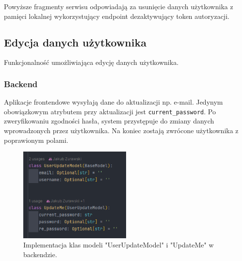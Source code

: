 Powyższe fragmenty serwisu odpowiadają za usunięcie danych użytkownika z pamięci lokalnej wykorzystujący endpoint dezaktywujący token autoryzacji.

\subsection{Edycja danych użytkownika}
Funkcjonalność umożliwiająca edycję danych użytkownika.

\subsubsection{Backend}
Aplikacje frontendowe wysyłają dane do aktualizacji np. e-mail. Jedynym obowiązkowym atrybutem przy aktualizacji jest \texttt{current\_password}. Po zweryfikowaniu zgodności hasła, system przystępuje do zmiany danych wprowadzonych przez użytkownika. Na koniec zostają zwrócone użytkownika z poprawionym polami.

\begin{figure}[H]
    \centering
    \includegraphics[width=0.5\textwidth]{chapters/chapter_8/screens/edit_user_backend_1}
    \caption{Implementacja klas modeli "UserUpdateModel" i "UpdateMe" w backendzie.}
    \label{img:edit_user_backend_1}
\end{figure}

